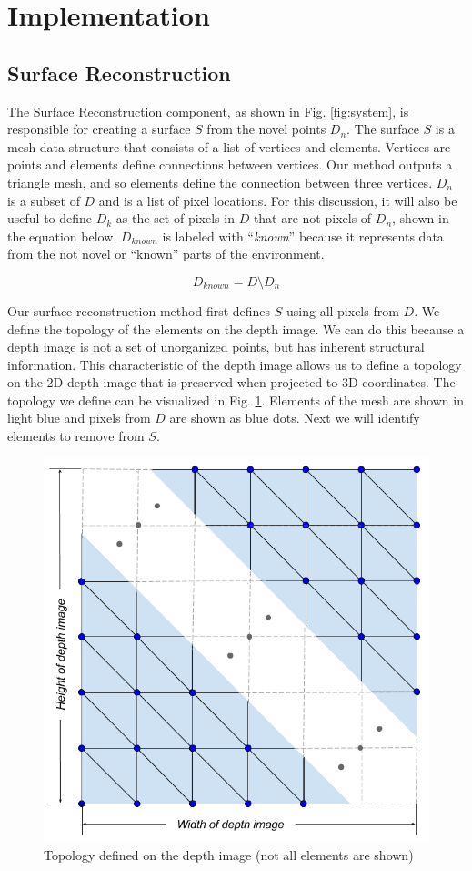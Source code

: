 \section{Implementation}

\subsection{Surface Reconstruction}
\label{subsection:surface_reconstruction}

The Surface Reconstruction component, as shown in Fig. \ref{fig:system}, is
responsible for creating a surface $S$ from the novel points $D_n$. The surface
$S$ is a mesh data structure that consists of a list of vertices and elements.
Vertices are points and elements define connections between vertices. Our method
outputs a triangle mesh, and so elements define the connection between three
vertices. $D_n$ is a subset of $D$ and is a list of pixel locations. For this
discussion, it will also be useful to define $D_k$ as the set of pixels in $D$
that are not pixels of $D_n$, shown in the equation below. $D_{known}$ is
labeled with ``\emph{known}'' because it represents data from the not novel or
``known'' parts of the environment.

$$
D_{known} = D \setminus D_n
$$

Our surface reconstruction method first defines $S$ using all pixels from $D$.
We define the topology of the elements on the depth image. We can do this
because a depth image is not a set of unorganized points, but has inherent
structural information. This characteristic of the depth image allows us to
define a topology on the 2D depth image that is preserved when projected to 3D
coordinates. The topology we define can be visualized in Fig. \ref{fig:sr_t}.
Elements of the mesh are shown in light blue and pixels from $D$ are shown as
blue dots. Next we will identify elements to remove from $S$.

\begin{figure}[h]%
\centering
  \includegraphics[width=.70\textwidth]
    {figures/diagram_sr_topology.png}
  \caption{Topology defined on the depth image (not all elements are shown)}
  \label{fig:sr_t}
\end{figure}

